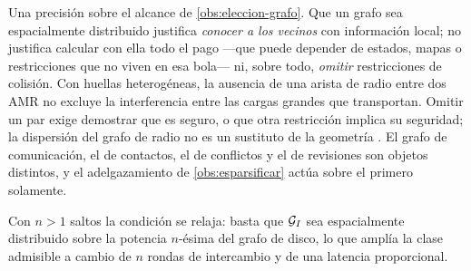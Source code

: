 \begin{observacion}
\label{obs:cuatro-grafos}
Una precisión sobre el alcance de \cref{obs:eleccion-grafo}.
Que un grafo sea espacialmente distribuido justifica \emph{conocer a los
vecinos} con información local; no justifica calcular con ella todo el pago
—que puede depender de estados, mapas o restricciones que no viven en esa
bola— ni, sobre todo, \emph{omitir} restricciones de colisión. Con huellas
heterogéneas, la ausencia de una arista de radio entre dos AMR no excluye la
interferencia entre las cargas grandes que transportan. Omitir un par exige
demostrar que es seguro, o que otra restricción implica su seguridad; la
dispersión del grafo de radio no es un sustituto de la geometría
\cite{mayorga2026m1}. El grafo de comunicación, el de contactos, el de
conflictos y el de revisiones son objetos distintos, y el adelgazamiento de
\cref{obs:esparsificar} actúa sobre el primero solamente.
\end{observacion}

\figGrafos

Con $n>1$ saltos la condición se relaja: basta que $\mathcal{G}_I$ sea espacialmente
distribuido sobre la potencia $n$-ésima del grafo de disco, lo que amplía la
clase admisible a cambio de $n$ rondas de intercambio y de una latencia
proporcional.
